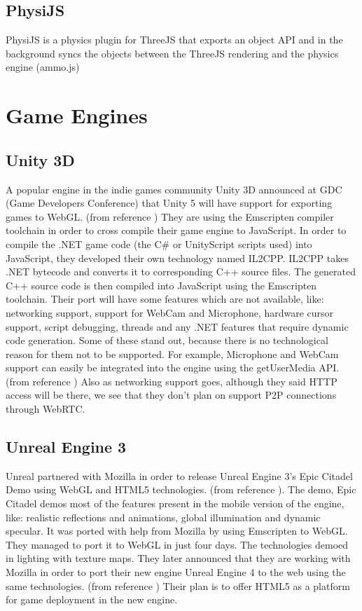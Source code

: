 \subsection{PhysiJS} 

PhysiJS is a physics plugin for ThreeJS that exports an object API and in the background syncs the objects between the ThreeJS rendering and the physics engine (ammo.js)

\section{Game Engines}

\subsection{Unity 3D}

A popular engine in the indie games community Unity 3D announced at GDC (Game Developers Conference) that Unity 5 will have support for exporting games to WebGL. (from reference \cite{echterhoff14}) They are using the Emscripten compiler toolchain in order to cross compile their game engine to JavaScript. In order to compile the .NET game code (the C\# or UnityScript scripts used) into JavaScript, they developed their own technology named IL2CPP.  IL2CPP takes .NET bytecode and converts it to corresponding C++ source files. The generated C++ source code is then compiled into JavaScript using the Emscripten toolchain.
Their port will have some features which are not available, like: networking support, support for WebCam and Microphone, hardware cursor support, script debugging, threads and any .NET features that require dynamic code generation.
Some of these stand out, because there is no technological reason for them not to be supported. For example, Microphone and WebCam support can easily be integrated into the engine using the getUserMedia API. (from reference \cite{bidelman12}) Also as networking support goes, although they said HTTP access will be there, we see that they don’t plan on support P2P connections through WebRTC.

\subsection{Unreal Engine 3}

Unreal partnered with Mozilla in order to release Unreal Engine 3’s Epic Citadel Demo using WebGL and HTML5 technologies. (from reference \cite{unrealengine13}). The demo, Epic Citadel demos most of the features present in the mobile version of the engine, like: realistic reflections and animations, global illumination and dynamic specular. It was ported with help from Mozilla by using Emscripten to WebGL. They managed to port it to WebGL in just four days. The technologies demoed in lighting with texture maps. They later announced that they are working with Mozilla in order to port their new engine Unreal Engine 4 to the web using the same technologies. (from reference \cite{lardinois14}) Their plan is to offer HTML5 as a platform for game deployment in the new engine.

